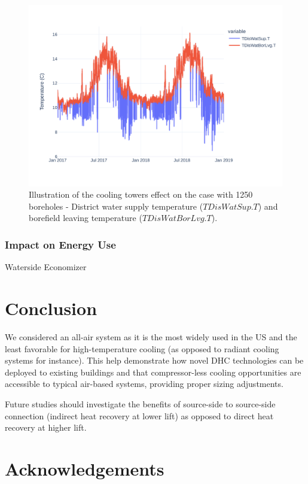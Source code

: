 \begin{figure}[!htbp]
\centering
\includegraphics[width=\linewidth]{../python_scripts/figures/GeoBestCaseT.pdf}
\caption{Illustration of the cooling towers effect on the case with 1250 boreholes - District water supply temperature ($TDisWatSup.T$) and borefield leaving temperature ($TDisWatBorLvg.T$).}
\label{fig:coolingeffect}
\end{figure}


\subsubsection{Impact on Energy Use} \label{sec:energy}

Waterside Economizer







\section{Conclusion} \label{sec:concl}

We considered an all-air system as it is the most widely used in the US and the least favorable for high-temperature cooling (as opposed to radiant cooling systems for instance).
This help demonstrate how novel DHC technologies can be deployed to existing buildings and that compressor-less cooling opportunities are accessible to typical air-based systems, providing proper sizing adjustments.

Future studies should investigate the benefits of source-side to source-side connection (indirect heat recovery at lower lift) as opposed to direct heat recovery at higher lift.

\section{Acknowledgements} \label{sec:acknowledge}
